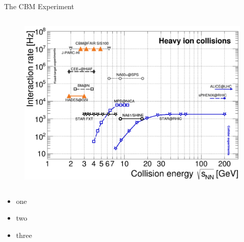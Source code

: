 \begin{columnframe}{The CBM Experiment}
    \begin{column}{0.5\textwidth}
        \begin{figure}
            \centering
            \includegraphics[width=\textwidth, frame]{images/galatyuk_map_of_experiments.png}
        \end{figure}
    \end{column}
    \begin{column}{0.5\textwidth}
        \begin{itemize}
            \item one
            \item two
            \item three
        \end{itemize}
    \end{column}
\end{columnframe}

